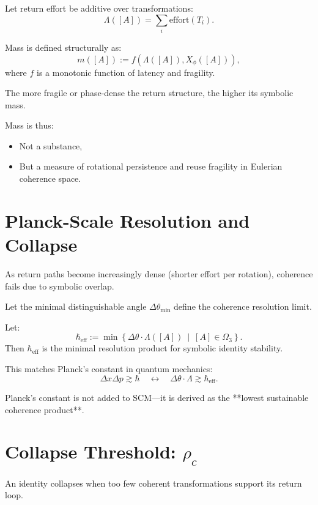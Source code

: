 Let return effort be additive over transformations:
\[
\Lambda([A]) = \sum_{i} \text{effort}(T_i).
\]

\begin{definition}
Mass is defined structurally as:
\[
m([A]) := f(\Lambda([A]), X_\phi([A])),
\]
where $f$ is a monotonic function of latency and fragility.
\end{definition}

\noindent The more fragile or phase-dense the return structure, the higher its symbolic mass.

Mass is thus:
\begin{itemize}
    \item Not a substance,
    \item But a measure of rotational persistence and reuse fragility in Eulerian coherence space.
\end{itemize}

\section{Planck-Scale Resolution and Collapse}

As return paths become increasingly dense (shorter effort per rotation), coherence fails due to symbolic overlap.

Let the minimal distinguishable angle $\Delta \theta_{\min}$ define the coherence resolution limit.

\begin{definition}
Let:
\[
\hbar_{\text{eff}} := \min \left\{ \Delta \theta \cdot \Lambda([A]) \ \middle| \ [A] \in \Omega_3 \right\}.
\]
Then $\hbar_{\text{eff}}$ is the minimal resolution product for symbolic identity stability.
\end{definition}

This matches Planck's constant in quantum mechanics:
\[
\Delta x \Delta p \gtrsim \hbar \quad \leftrightarrow \quad \Delta \theta \cdot \Lambda \gtrsim \hbar_{\text{eff}}.
\]

\noindent Planck’s constant is not added to SCM—it is derived as the **lowest sustainable coherence product**.

\section{Collapse Threshold: $\rho_c$}

An identity collapses when too few coherent transformations support its return loop.

